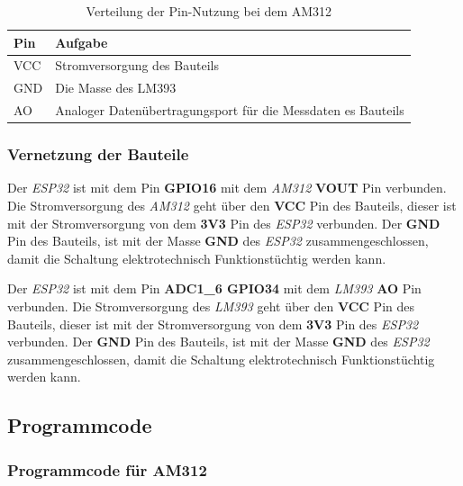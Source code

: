 \documentclass[18pt]{article}
\begin{document}
\begin{table}[h!] %
	\centering %
	\caption{Verteilung der Pin-Nutzung bei dem AM312} %
	\label{tab:teil_2_steckbrett_lm393} %
	\begin{tabular}{|l|l|} %
		\hline
		Pin & Aufgabe \\
		\hline
		VCC & Stromversorgung des Bauteils \\
		GND & Die Masse des LM393 \\
		AO & Analoger Datenübertragungsport für die Messdaten es Bauteils \\
		\hline %
	\end{tabular}
\end{table}
\renewcommand{\arraystretch}{1}

\subsubsection{Vernetzung der Bauteile}
Der \textit{ESP32} ist mit dem Pin \textbf{GPIO16} mit dem \textit{AM312} \textbf{VOUT} Pin verbunden.
Die Stromversorgung des \textit{AM312} geht über den \textbf{VCC} Pin des Bauteils, dieser ist mit der Stromversorgung von dem \textbf{3V3} Pin des \textit{ESP32} verbunden.
Der \textbf{GND} Pin des Bauteils, ist mit der Masse \textbf{GND} des \textit{ESP32} zusammengeschlossen, damit die Schaltung elektrotechnisch Funktionstüchtig werden kann.

Der \textit{ESP32} ist mit dem Pin \textbf{ADC1\_6 GPIO34} mit dem \textit{LM393} \textbf{AO} Pin verbunden.
Die Stromversorgung des \textit{LM393} geht über den \textbf{VCC} Pin des Bauteils, dieser ist mit der Stromversorgung von dem \textbf{3V3} Pin des \textit{ESP32} verbunden.
Der \textbf{GND} Pin des Bauteils, ist mit der Masse \textbf{GND} des \textit{ESP32} zusammengeschlossen, damit die Schaltung elektrotechnisch Funktionstüchtig werden kann.
\newpage
\subsection{Programmcode}
\subsubsection{Programmcode für AM312}
\end{document}
